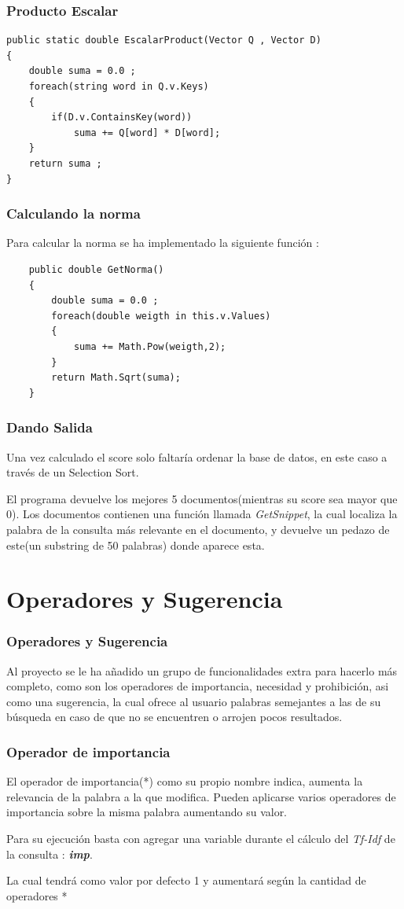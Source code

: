 \documentclass{beamer}
\begin{document}
\begin{frame}[fragile]
    \frametitle{Producto Escalar}

    \begin{lstlisting} 
public static double EscalarProduct(Vector Q , Vector D)
{
    double suma = 0.0 ;
    foreach(string word in Q.v.Keys)
    {
        if(D.v.ContainsKey(word))
            suma += Q[word] * D[word];
    }
    return suma ;
}
    \end{lstlisting}   
\end{frame}

\begin{frame}[fragile]
    \frametitle{Calculando la norma}
    Para calcular la norma se ha implementado la siguiente función :

    \begin{lstlisting} 
    public double GetNorma()
    {
        double suma = 0.0 ;
        foreach(double weigth in this.v.Values)
        {
            suma += Math.Pow(weigth,2);            
        }
        return Math.Sqrt(suma);
    }
    \end{lstlisting}
\end{frame}

\begin{frame}
    \frametitle{Dando Salida}
    Una vez calculado el score solo faltaría ordenar la base de datos, en este caso a través de un Selection Sort.

    El programa devuelve los mejores 5 documentos(mientras su score sea mayor que 0). Los documentos contienen una función
    llamada \textit{GetSnippet}, la cual localiza la palabra de la consulta más relevante en el documento, y devuelve un pedazo
    de este(un substring de 50 palabras) donde aparece esta.

\end{frame}
\section{Operadores y Sugerencia}
\begin{frame}
    \frametitle{Operadores y Sugerencia}
    Al proyecto se le ha añadido un grupo de funcionalidades extra para hacerlo más completo, como son
    los operadores de importancia, necesidad y prohibición, asi como una sugerencia, la cual ofrece al usuario
    palabras semejantes a las de su búsqueda en caso de que no se encuentren o arrojen pocos resultados.
\end{frame}

\begin{frame}
    \frametitle{Operador de importancia}
    El operador de importancia(*) como su propio nombre indica, aumenta la relevancia de la palabra a la que modifica. Pueden 
    aplicarse varios operadores de importancia sobre la misma palabra aumentando su valor.

    Para su ejecución basta con agregar una variable durante el cálculo del \textit{Tf-Idf} de la consulta : \textit{\textbf{imp}}.

    La cual tendrá como valor por defecto 1 y aumentará según la cantidad de operadores *
\end{frame}
\end{document}
